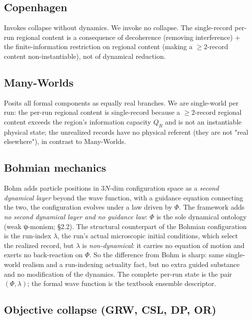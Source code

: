 \documentclass[11pt,a4paper]{article}
\begin{document}
\subsection{Copenhagen}

Invokes collapse without dynamics. We invoke no collapse. The single-record per-run regional content is a consequence of decoherence (removing interference) + the finite-information restriction on regional content (making a $\ge 2$-record content non-instantiable), not of dynamical reduction.

\subsection{Many-Worlds}

Posits all formal components as equally real branches. We are single-world per run: the per-run regional content is single-record because a $\ge 2$-record regional content exceeds the region's information capacity $Q_R$ and is not an instantiable physical state; the unrealized records have no physical referent (they are not "real elsewhere"), in contrast to Many-Worlds.

\subsection{Bohmian mechanics}

Bohm adds particle positions in $3N$-dim configuration space as a \emph{second dynamical layer} beyond the wave function, with a guidance equation connecting the two, the configuration evolves under a law driven by $\Phi$. The framework adds \emph{no second dynamical layer and no guidance law}: $\Phi$ is the sole dynamical ontology (weak ψ-monism; §2.2). The structural counterpart of the Bohmian configuration is the run-index $\lambda$, the run's actual microscopic initial conditions, which select the realized record, but $\lambda$ is \emph{non-dynamical}: it carries no equation of motion and exerts no back-reaction on $\Phi$. So the difference from Bohm is sharp: same single-world realism and a run-indexing actuality fact, but no extra guided substance and no modification of the dynamics. The complete per-run state is the pair $(\Phi, \lambda)$; the formal wave function is the textbook ensemble descriptor.

\subsection{Objective collapse (GRW, CSL, DP, OR)}
\end{document}
